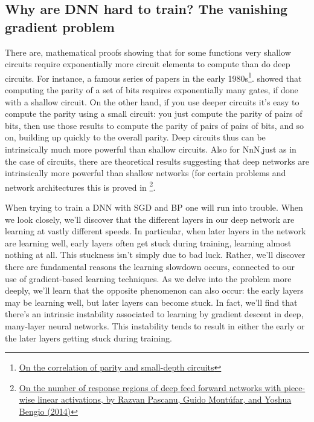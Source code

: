 \subsection{Why are DNN hard to train? The vanishing gradient problem}
There are, mathematical proofs showing that for some functions very shallow circuits require exponentially more circuit elements to compute than do deep circuits. For instance, a famous series of papers in the early 1980s\footnote{\href{http://eccc.hpi-web.de/report/2012/137/}{On the correlation of parity and small-depth circuits}}. showed that computing the parity of a set of bits requires exponentially many gates, if done with a shallow circuit. On the other hand, if you use deeper circuits it's easy to compute the parity using a small circuit: you just compute the parity of pairs of bits, then use those results to compute the parity of pairs of pairs of bits, and so on, building up quickly to the overall parity. Deep circuits thus can be intrinsically much more powerful than shallow circuits. Also for NnN,just as in the case of circuits, there are theoretical results suggesting that deep networks are intrinsically more powerful than shallow networks (for certain problems and network architectures this is proved in \footnote{\href{https://arxiv.org/pdf/1312.6098.pdf}{On the number of response regions of deep feed forward networks with piece-wise linear activations, by Razvan Pascanu, Guido Montúfar, and Yoshua Bengio (2014)}}.

When trying to train a DNN with SGD and BP one will run into trouble. When we look closely, we'll discover that the different layers in our deep network are learning at vastly different speeds. In particular, when later layers in the network are learning well, early layers often get stuck during training, learning almost nothing at all. This stuckness isn't simply due to bad luck. Rather, we'll discover there are fundamental reasons the learning slowdown occurs, connected to our use of gradient-based learning techniques. As we delve into the problem more deeply, we'll learn that the opposite phenomenon can also occur: the early layers may be learning well, but later layers can become stuck. In fact, we'll find that there's an intrinsic instability associated to learning by gradient descent in deep, many-layer neural networks. This instability tends to result in either the early or the later layers getting stuck during training.


